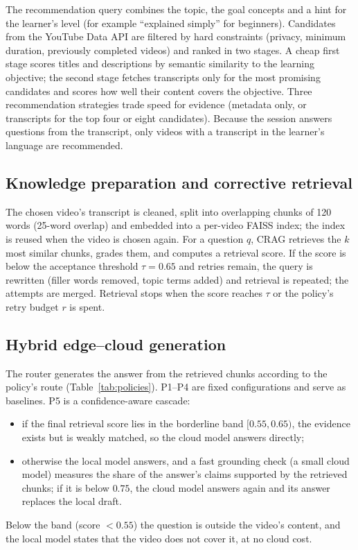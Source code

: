 The recommendation query combines the topic, the goal concepts and a hint for the learner's level (for example
``explained simply'' for beginners). Candidates from the YouTube Data API are filtered by hard constraints (privacy,
minimum duration, previously completed videos) and ranked in two stages. A cheap first stage scores titles and
descriptions by semantic similarity to the learning objective; the second stage fetches transcripts only for the
most promising candidates and scores how well their content covers the objective. Three recommendation strategies
trade speed for evidence (metadata only, or transcripts for the top four or eight candidates). Because the session
answers questions from the transcript, only videos with a transcript in the learner's language are recommended.

\subsection{Knowledge preparation and corrective retrieval}

The chosen video's transcript is cleaned, split into overlapping chunks of 120 words (25-word overlap) and embedded
into a per-video FAISS index; the index is reused when the video is chosen again. For a question $q$, CRAG retrieves
the $k$ most similar chunks, grades them, and computes a retrieval score. If the score is below the acceptance
threshold $\tau = 0.65$ and retries remain, the query is rewritten (filler words removed, topic terms added) and
retrieval is repeated; the attempts are merged. Retrieval stops when the score reaches $\tau$ or the policy's retry
budget $r$ is spent.

\subsection{Hybrid edge--cloud generation}

The router generates the answer from the retrieved chunks according to the policy's route
(Table~\ref{tab:policies}). P1--P4 are fixed configurations and serve as baselines. P5 is a confidence-aware cascade:
\begin{itemize}
  \item if the final retrieval score lies in the borderline band $[0.55, 0.65)$, the evidence exists but is weakly
        matched, so the cloud model answers directly;
  \item otherwise the local model answers, and a fast grounding check (a small cloud model) measures the share of the
        answer's claims supported by the retrieved chunks; if it is below $0.75$, the cloud model answers again and its
        answer replaces the local draft.
\end{itemize}
Below the band (score $< 0.55$) the question is outside the video's content, and the local model states that the
video does not cover it, at no cloud cost.

